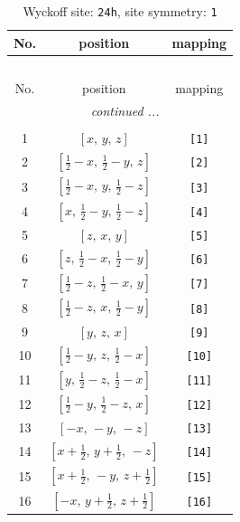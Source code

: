 \documentclass[fleqn,8pt]{jsarticle}
\begin{document}
\begin{longtable}{ccc}
\caption{Wyckoff site: {\tt 24h}, site symmetry: {\tt 1}}
 \\
 \hline \hline
No. & position & mapping \\ \hline \endfirsthead

\multicolumn{2}{l}{\tablename\ \thetable{}} \\
 \hline \hline
No. & position & mapping \\ \hline \endhead

 \hline \hline
\multicolumn{2}{r}{\footnotesize\it continued ...} \\ \endfoot

 \hline \hline
\multicolumn{2}{r}{} \\ \endlastfoot

1 & $\left[ x,\, y,\, z \right]$ & {\tt [1]} \\ \hline
2 & $\left[ \frac{1}{2} - x,\, \frac{1}{2} - y,\, z \right]$ & {\tt [2]} \\ \hline
3 & $\left[ \frac{1}{2} - x,\, y,\, \frac{1}{2} - z \right]$ & {\tt [3]} \\ \hline
4 & $\left[ x,\, \frac{1}{2} - y,\, \frac{1}{2} - z \right]$ & {\tt [4]} \\ \hline
5 & $\left[ z,\, x,\, y \right]$ & {\tt [5]} \\ \hline
6 & $\left[ z,\, \frac{1}{2} - x,\, \frac{1}{2} - y \right]$ & {\tt [6]} \\ \hline
7 & $\left[ \frac{1}{2} - z,\, \frac{1}{2} - x,\, y \right]$ & {\tt [7]} \\ \hline
8 & $\left[ \frac{1}{2} - z,\, x,\, \frac{1}{2} - y \right]$ & {\tt [8]} \\ \hline
9 & $\left[ y,\, z,\, x \right]$ & {\tt [9]} \\ \hline
10 & $\left[ \frac{1}{2} - y,\, z,\, \frac{1}{2} - x \right]$ & {\tt [10]} \\ \hline
11 & $\left[ y,\, \frac{1}{2} - z,\, \frac{1}{2} - x \right]$ & {\tt [11]} \\ \hline
12 & $\left[ \frac{1}{2} - y,\, \frac{1}{2} - z,\, x \right]$ & {\tt [12]} \\ \hline
13 & $\left[ - x,\, - y,\, - z \right]$ & {\tt [13]} \\ \hline
14 & $\left[ x + \frac{1}{2},\, y + \frac{1}{2},\, - z \right]$ & {\tt [14]} \\ \hline
15 & $\left[ x + \frac{1}{2},\, - y,\, z + \frac{1}{2} \right]$ & {\tt [15]} \\ \hline
16 & $\left[ - x,\, y + \frac{1}{2},\, z + \frac{1}{2} \right]$ & {\tt [16]} \\ \hline

\end{longtable}
\end{document}
